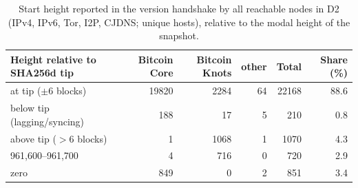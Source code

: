 \begin{table}[t]
\centering\small
\caption{Start height reported in the version handshake by all reachable nodes in D2 (IPv4, IPv6, Tor, I2P, CJDNS; unique hosts), relative to the modal height of the snapshot.}
\label{tab:chainview}

\begin{tabular}{lrrrrr}
\toprule
Height relative to SHA256d tip & Bitcoin Core & Bitcoin Knots & other & Total & Share (\%) \\
\midrule
at tip ($\pm$6 blocks) & 19820 & 2284 & 64 & 22168 & 88.6 \\
below tip (lagging/syncing) & 188 & 17 & 5 & 210 & 0.8 \\
above tip ($>$6 blocks) & 1 & 1068 & 1 & 1070 & 4.3 \\
961{,}600--961{,}700 & 4 & 716 & 0 & 720 & 2.9 \\
zero & 849 & 0 & 2 & 851 & 3.4 \\
\bottomrule
\end{tabular}
\end{table}
